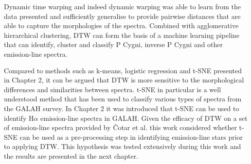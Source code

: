 Dynamic time warping and indeed dynamic  warping was able to learn from the data presented and sufficiently generalise to provide pairwise distances that are able to capture the morphologies of the spectra. Combined with agglomerative hierarchical clustering, DTW can form the basis of a machine learning pipeline that can identify, cluster and classify P Cygni, inverse P Cygni and other emission-line spectra.

Compared to methods such as k-means, logistic regression and t-SNE presented in Chapter 2, it can be argued that DTW is more sensitive to the morphological differences and similarities between spectra. t-SNE in particular is a well understood method that has been used to classify various types of spectra from the GALAH survey. In Chapter 2 it was introduced that t-SNE can be used to identify H$\alpha$ emission-line spectra in GALAH. Given the efficacy of DTW on a set of emission-line spectra provided by Čotar et al. this work considered whether t-SNE can be used as a pre-processing step in identifying emission-line stars prior to applying DTW. This hypothesis was tested extensively during this work and the results are presented in the next chapter. 








